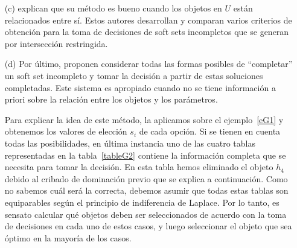 \begin{enumerate}
\item[(c)]  \citet{Hanetal} explican que su método es bueno cuando los objetos en $U$ están relacionados entre sí. Estos autores desarrollan y comparan varios criterios de obtención para la toma de decisiones de soft sets incompletos que se generan por intersección restringida. 

\item[(d)] Por último, \citet{AlcantudSantos17} proponen considerar todas las formas posibles de ``completar'' un soft set incompleto y tomar la decisión a partir de estas soluciones completadas. Este sistema es apropiado cuando no se tiene información a priori sobre la relación entre los objetos y los parámetros.

Para explicar la idea de este método, la aplicamos sobre el ejemplo~\ref{eG1} y obtenemos los valores de elección $s_i$ de cada opción. Si se tienen en cuenta todas las posibilidades, en última instancia uno de las cuatro tablas representadas en la tabla~\ref{tableG2} contiene la información completa que se necesita para tomar la decisión. 
En esta tabla hemos eliminado el objeto $h_4$ debido al cribado de dominación previo que se explica a continuación.
Como no sabemos cuál será la correcta, debemos asumir que todas estas tablas son equiparables según el principio de indiferencia de Laplace. Por lo tanto, es sensato calcular qué objetos deben ser seleccionados de acuerdo con la toma de decisiones en cada uno de estos casos, y luego seleccionar el objeto que sea óptimo en la mayoría de los casos.
\end{enumerate}


